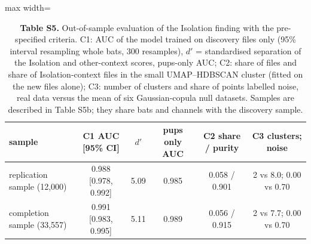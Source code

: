 \begin{table}[htbp]\centering\scriptsize
\caption{\textbf{Table S5.} Out-of-sample evaluation of the Isolation finding with the pre-specified criteria. C1: AUC of the model trained on discovery files only (95\% interval resampling whole bats, 300 resamples), $d'$ = standardised separation of the Isolation and other-context scores, pups-only AUC; C2: share of files and share of Isolation-context files in the small UMAP--HDBSCAN cluster (fitted on the new files alone); C3: number of clusters and share of points labelled noise, real data versus the mean of six Gaussian-copula null datasets. Samples are described in Table S5b; they share bats and channels with the discovery sample.}\label{tab:S5}
\begin{adjustbox}{max width=\linewidth}
\begin{tabular}{lccccc}
\toprule
sample & C1 AUC [95\% CI] & $d'$ & pups only AUC & C2 share / purity & C3 clusters; noise \\
\midrule
replication sample (12,000) & 0.988 [0.978, 0.992] & 5.09 & 0.985 & 0.058 / 0.901 & 2 vs 8.0; 0.00 vs 0.70 \\
completion sample (33,557) & 0.991 [0.983, 0.995] & 5.11 & 0.989 & 0.056 / 0.915 & 2 vs 7.7; 0.00 vs 0.70 \\
\bottomrule
\end{tabular}
\end{adjustbox}
\end{table}
